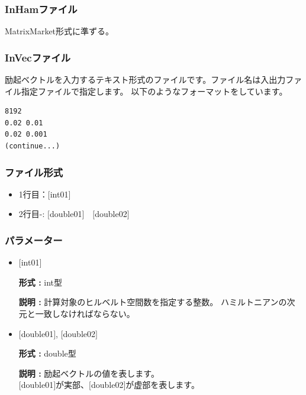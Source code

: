 \documentclass[12pt,titlepage]{jarticle}
\begin{document}
\newpage
\subsubsection{InHamファイル} \label{subsubsec:ham}
MatrixMarket形式に準ずる。

\subsubsection{InVecファイル}\label{subsubsec:vec}
励起ベクトルを入力するテキスト形式のファイルです。ファイル名は入出力ファイル指定ファイルで指定します。
以下のようなフォーマットをしています。
\\
\begin{minipage}{10cm}
\begin{screen}
\begin{verbatim}
8192
0.02 0.01
0.02 0.001
(continue...)
\end{verbatim}
\end{screen}
\end{minipage}


\subsubsection{ファイル形式}
\begin{itemize}
\item  1行目：$[$int01$]$
\item  2行目-: $[$double01$]$~~$[$double02$]$
\end{itemize}
\subsubsection{パラメーター}
\begin{itemize}
  
\item  $[$int01$]$
  
  {\bf 形式 :} int型
  
  {\bf 説明 :} 計算対象のヒルベルト空間数を指定する整数。
  ハミルトニアンの次元と一致しなければならない。
 
\item  $[$double01$]$, $[$double02$]$
  
  {\bf 形式 :} double型 
  
  {\bf 説明 :} 励起ベクトルの値を表します。\\
  $[$double01$]$が実部、$[$double02$]$が虚部を表します。\\
\end{itemize}
\end{document}
